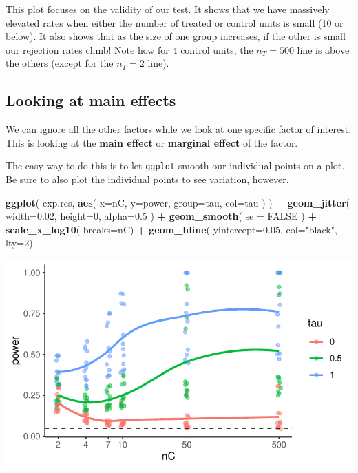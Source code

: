 \documentclass[
]{book}
\newenvironment{Shaded}{\begin{snugshade}}{\end{snugshade}}
\newcommand{\AttributeTok}[1]{\textcolor[rgb]{0.13,0.29,0.53}{#1}}
\newcommand{\ConstantTok}[1]{\textcolor[rgb]{0.56,0.35,0.01}{#1}}
\newcommand{\DecValTok}[1]{\textcolor[rgb]{0.00,0.00,0.81}{#1}}
\newcommand{\FloatTok}[1]{\textcolor[rgb]{0.00,0.00,0.81}{#1}}
\newcommand{\FunctionTok}[1]{\textcolor[rgb]{0.13,0.29,0.53}{\textbf{#1}}}
\newcommand{\NormalTok}[1]{#1}
\newcommand{\SpecialCharTok}[1]{\textcolor[rgb]{0.81,0.36,0.00}{\textbf{#1}}}
\newcommand{\StringTok}[1]{\textcolor[rgb]{0.31,0.60,0.02}{#1}}
\begin{document}
This plot focuses on the validity of our test.
It shows that we have massively elevated rates when either the number of treated or control units is small (10 or below).
It also shows that as the size of one group increases, if the other is small our rejection rates climb! Note how for 4 control units, the \(n_T = 500\) line is above the others (except for the \(n_T = 2\) line).

\subsection{Looking at main effects}\label{looking-at-main-effects}

We can ignore all the other factors while we look at one specific factor of interest.
This is looking at the \textbf{main effect} or \textbf{marginal effect} of the factor.

The easy way to do this is to let \texttt{ggplot} smooth our individual points on a
plot. Be sure to also plot the individual points to see variation, however.

\begin{Shaded}
\begin{Highlighting}[]
\FunctionTok{ggplot}\NormalTok{( exp.res, }\FunctionTok{aes}\NormalTok{( }\AttributeTok{x=}\NormalTok{nC, }\AttributeTok{y=}\NormalTok{power, }\AttributeTok{group=}\NormalTok{tau, }\AttributeTok{col=}\NormalTok{tau ) ) }\SpecialCharTok{+}
  \FunctionTok{geom\_jitter}\NormalTok{( }\AttributeTok{width=}\FloatTok{0.02}\NormalTok{, }\AttributeTok{height=}\DecValTok{0}\NormalTok{, }\AttributeTok{alpha=}\FloatTok{0.5}\NormalTok{ ) }\SpecialCharTok{+}
  \FunctionTok{geom\_smooth}\NormalTok{( }\AttributeTok{se =} \ConstantTok{FALSE}\NormalTok{ ) }\SpecialCharTok{+}
  \FunctionTok{scale\_x\_log10}\NormalTok{( }\AttributeTok{breaks=}\NormalTok{nC) }\SpecialCharTok{+}
  \FunctionTok{geom\_hline}\NormalTok{( }\AttributeTok{yintercept=}\FloatTok{0.05}\NormalTok{, }\AttributeTok{col=}\StringTok{"black"}\NormalTok{, }\AttributeTok{lty=}\DecValTok{2}\NormalTok{)}
\end{Highlighting}
\end{Shaded}

\begin{center}\includegraphics[width=0.75\linewidth]{Designing-Simulations-in-R_files/figure-latex/plotPool-1} \end{center}
\end{document}
